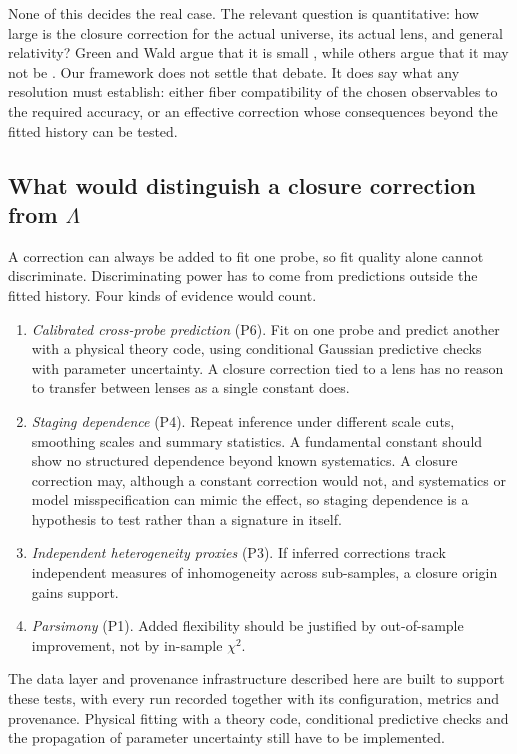 \documentclass[11pt]{article}
\theoremstyle{plain}
\theoremstyle{definition}
\theoremstyle{remark}
\begin{document}
None of this decides the real case. The relevant question is quantitative: how large is the closure correction for the actual universe, its actual lens, and general relativity? Green and Wald argue that it is small \cite{GreenWald2014FLRW}, while others argue that it may not be \cite{Rasanen2004Backreaction,Kolb2006Acceleration,Wiltshire2007Cosmic,Buchert2015Backreaction}. Our framework does not settle that debate. It does say what any resolution must establish: either fiber compatibility of the chosen observables to the required accuracy, or an effective correction whose consequences beyond the fitted history can be tested.

\subsection{What would distinguish a closure correction from \texorpdfstring{$\Lambda$}{Lambda}}\label{sec:discussion:tests}

A correction can always be added to fit one probe, so fit quality alone cannot discriminate. Discriminating power has to come from predictions outside the fitted history. Four kinds of evidence would count.
\begin{enumerate}
  \item \emph{Calibrated cross-probe prediction} (P6). Fit on one probe and predict another with a physical theory code, using conditional Gaussian predictive checks with parameter uncertainty. A closure correction tied to a lens has no reason to transfer between lenses as a single constant does.
  \item \emph{Staging dependence} (P4). Repeat inference under different scale cuts, smoothing scales and summary statistics. A fundamental constant should show no structured dependence beyond known systematics. A closure correction may, although a constant correction would not, and systematics or model misspecification can mimic the effect, so staging dependence is a hypothesis to test rather than a signature in itself.
  \item \emph{Independent heterogeneity proxies} (P3). If inferred corrections track independent measures of inhomogeneity across sub-samples, a closure origin gains support.
  \item \emph{Parsimony} (P1). Added flexibility should be justified by out-of-sample improvement, not by in-sample $\chi^2$.
\end{enumerate}
The data layer and provenance infrastructure described here are built to support these tests, with every run recorded together with its configuration, metrics and provenance. Physical fitting with a theory code, conditional predictive checks and the propagation of parameter uncertainty still have to be implemented.
\end{document}
